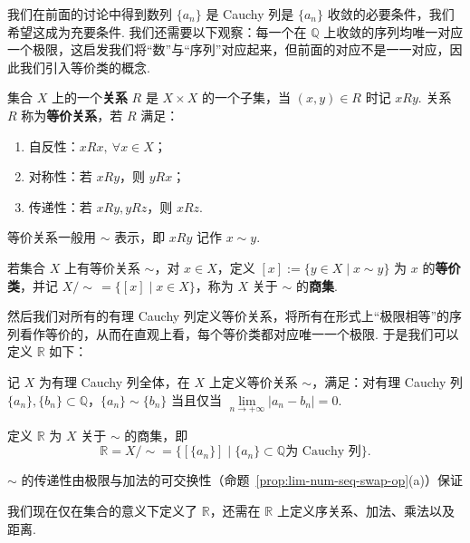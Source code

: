\documentclass[../main.tex]{subfiles}
\begin{document}
我们在前面的讨论中得到数列 $\{a_n\}$ 是 Cauchy 列是 $\{a_n\}$ 收敛的必要条件，我们希望这成为充要条件. 我们还需要以下观察：每一个在 $\mathbb Q$ 上收敛的序列均唯一对应一个极限，这启发我们将“数”与“序列”对应起来，但前面的对应不是一一对应，因此我们引入等价类的概念. 

\begin{definition}[等价关系与等价类的定义]
    集合 $X$ 上的一个\textbf{关系} $R$ 是 $X \times X$ 的一个子集，当 $(x, y) \in R$ 时记 $xRy$. 关系 $R$ 称为\textbf{等价关系}，若 $R$ 满足：
    \begin{enumerate}[label=(\alph*)]
        \item 自反性：$xRx,\ \forall x \in X$；
        \item 对称性：若 $xRy$，则 $yRx$；
        \item 传递性：若 $xRy, yRz$，则 $xRz$. 
    \end{enumerate}
    等价关系一般用 $\sim$ 表示，即 $xRy$ 记作 $x \sim y$. 

    若集合 $X$ 上有等价关系 $\sim$，对 $x \in X$，定义 $[x] := \{y \in X \mid x \sim y\}$ 为 $x$ 的\textbf{等价类}，并记 $X/\sim \,= \{[x] \mid x \in X\}$，称为 $X$ 关于 $\sim$ 的\textbf{商集}. 
\end{definition}

然后我们对所有的有理 Cauchy 列定义等价关系，将所有在形式上“极限相等”的序列看作等价的，从而在直观上看，每个等价类都对应唯一一个极限. 于是我们可以定义 $\mathbb R$ 如下：

\begin{definition} \label{def:R-Cauchy-seq}
    记 $X$ 为有理 Cauchy 列全体，在 $X$ 上定义等价关系 $\sim$，满足：对有理 Cauchy 列 $\{a_n\}, \{b_n\} \subset \mathbb Q$，$\{a_n\} \sim \{b_n\}$ 当且仅当 $\lim\limits_{n \to +\infty} |a_n - b_n| = 0$. 

    定义 $\mathbb R$ 为 $X$ 关于 $\sim$ 的商集，即 
    $$
    \mathbb R = X / \sim = \{[\{a_n\}] \mid \{a_n\} \subset \mathbb Q \text{为 Cauchy 列}\}. 
    $$
\end{definition}

\begin{remark}
    $\sim$ 的传递性由极限与加法的可交换性（命题~\ref{prop:lim-num-seq-swap-op}(a)）保证
\end{remark}

我们现在仅在集合的意义下定义了 $\mathbb R$，还需在 $\mathbb R$ 上定义序关系、加法、乘法以及距离. 
\end{document}
